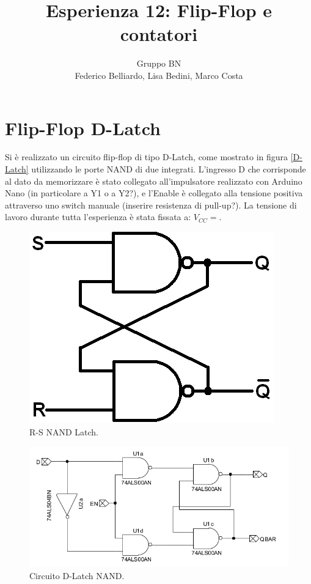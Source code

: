 \documentclass[10pt,a4paper]{article}
\author{Gruppo BN \\ Federico Belliardo, Lisa Bedini, Marco Costa}
\title{Esperienza 12: Flip-Flop e contatori}
\begin{document}
\maketitle

\section{Flip-Flop D-Latch}
Si è realizzato un circuito flip-flop di tipo D-Latch, come mostrato in figura \ref{D-Latch} utilizzando le porte NAND di due integrati. L'ingresso D che corrisponde al dato da memorizzare è stato collegato all'impulsatore realizzato con Arduino Nano (in particolare a Y1 o a Y2?), e l'Enable è collegato alla tensione positiva attraverso uno switch manuale (inserire resistenza di pull-up?). La tensione di lavoro durante tutta l'esperienza è stata fissata a: $V_{CC} = $.\\


\begin{figure}
\centering
\includegraphics[scale=0.5]{latchNand.png}
\caption{R-S NAND Latch.\label{fig:latch}}
\end{figure}

\begin{figure}
\centering
\includegraphics[scale=0.7]{flipflopDlatch.png}
\caption{Circuito  D-Latch NAND.\label{fig:circuito}}
\end{figure}
\end{document}
